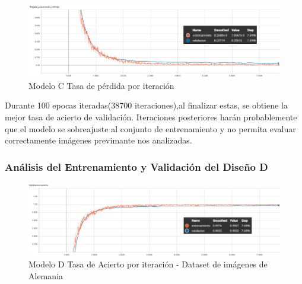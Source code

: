 			
			\begin{figure}[H]
				\begin{center}
				\includegraphics[width=1\textwidth]{images/desarrollo/trainResults/peru/model4Loss} 
				\end{center}
				\begin{center}
				\caption{\small{Modelo C Tasa de pérdida por iteración}}
				
				{\small{\fontsize{10}{16.8}\selectfont {Fuente: Elaboración propia}}}
				\end{center}
				\vspace{-1.5em}
			\end{figure}

			Durante 100 epocas iteradas(38700 iteraciones),al finalizar estas, se obtiene la mejor tasa de acierto de validación. Iteraciones posteriores harán probablemente que el modelo se sobreajuste al conjunto de entrenamiento y no permita evaluar correctamente imágenes previmante nos analizadas.

		\subsubsection{Análisis del Entrenamiento y Validación del Diseño D} 
			\begin{figure}[H]
				\begin{center}
				\includegraphics[width=1\textwidth]{images/desarrollo/trainResults/peru/model6Acierto} 
				\end{center}
				\begin{center}
				\caption{\small{Modelo D Tasa de Acierto por iteración - Dataset de imágenes de Alemania  }}
				
				{\small{\fontsize{10}{16.8}\selectfont {Fuente: Elaboración propia}}}
				\end{center}
				\vspace{-1.5em}
			\end{figure}
			
